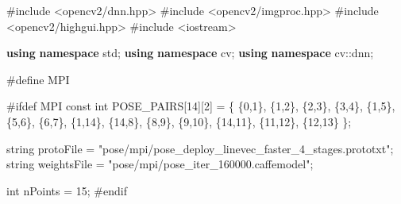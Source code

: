 \documentclass[
  12pt,
  a4paper,
]{article}
\newenvironment{Shaded}{}{}
\newcommand{\AttributeTok}[1]{\textcolor[rgb]{0.49,0.56,0.16}{#1}}
\newcommand{\DataTypeTok}[1]{\textcolor[rgb]{0.56,0.13,0.00}{#1}}
\newcommand{\DecValTok}[1]{\textcolor[rgb]{0.25,0.63,0.44}{#1}}
\newcommand{\ImportTok}[1]{#1}
\newcommand{\KeywordTok}[1]{\textcolor[rgb]{0.00,0.44,0.13}{\textbf{#1}}}
\newcommand{\NormalTok}[1]{#1}
\newcommand{\PreprocessorTok}[1]{\textcolor[rgb]{0.74,0.48,0.00}{#1}}
\newcommand{\StringTok}[1]{\textcolor[rgb]{0.25,0.44,0.63}{#1}}
\begin{document}
\begin{Shaded}
\begin{Highlighting}[numbers=left,,]
\PreprocessorTok{\#include }\ImportTok{\textless{}opencv2/dnn.hpp\textgreater{}}
\PreprocessorTok{\#include }\ImportTok{\textless{}opencv2/imgproc.hpp\textgreater{}}
\PreprocessorTok{\#include }\ImportTok{\textless{}opencv2/highgui.hpp\textgreater{}}
\PreprocessorTok{\#include }\ImportTok{\textless{}iostream\textgreater{}}

\KeywordTok{using} \KeywordTok{namespace}\NormalTok{ std;}
\KeywordTok{using} \KeywordTok{namespace}\NormalTok{ cv;}
\KeywordTok{using} \KeywordTok{namespace}\NormalTok{ cv::dnn;}

\PreprocessorTok{\#define MPI}

\PreprocessorTok{\#ifdef MPI}
\AttributeTok{const} \DataTypeTok{int}\NormalTok{ POSE\_PAIRS[}\DecValTok{14}\NormalTok{][}\DecValTok{2}\NormalTok{] = }
\NormalTok{\{   }
\NormalTok{    \{}\DecValTok{0}\NormalTok{,}\DecValTok{1}\NormalTok{\}, \{}\DecValTok{1}\NormalTok{,}\DecValTok{2}\NormalTok{\}, \{}\DecValTok{2}\NormalTok{,}\DecValTok{3}\NormalTok{\},}
\NormalTok{    \{}\DecValTok{3}\NormalTok{,}\DecValTok{4}\NormalTok{\}, \{}\DecValTok{1}\NormalTok{,}\DecValTok{5}\NormalTok{\}, \{}\DecValTok{5}\NormalTok{,}\DecValTok{6}\NormalTok{\},}
\NormalTok{    \{}\DecValTok{6}\NormalTok{,}\DecValTok{7}\NormalTok{\}, \{}\DecValTok{1}\NormalTok{,}\DecValTok{14}\NormalTok{\}, \{}\DecValTok{14}\NormalTok{,}\DecValTok{8}\NormalTok{\}, \{}\DecValTok{8}\NormalTok{,}\DecValTok{9}\NormalTok{\},}
\NormalTok{    \{}\DecValTok{9}\NormalTok{,}\DecValTok{10}\NormalTok{\}, \{}\DecValTok{14}\NormalTok{,}\DecValTok{11}\NormalTok{\}, \{}\DecValTok{11}\NormalTok{,}\DecValTok{12}\NormalTok{\}, \{}\DecValTok{12}\NormalTok{,}\DecValTok{13}\NormalTok{\}}
\NormalTok{\};}

\NormalTok{string protoFile = }\StringTok{"pose/mpi/pose\_deploy\_linevec\_faster\_4\_stages.prototxt"}\NormalTok{;}
\NormalTok{string weightsFile = }\StringTok{"pose/mpi/pose\_iter\_160000.caffemodel"}\NormalTok{;}

\DataTypeTok{int}\NormalTok{ nPoints = }\DecValTok{15}\NormalTok{;}
\PreprocessorTok{\#endif}


\end{Highlighting}
\end{Shaded}
\end{document}
